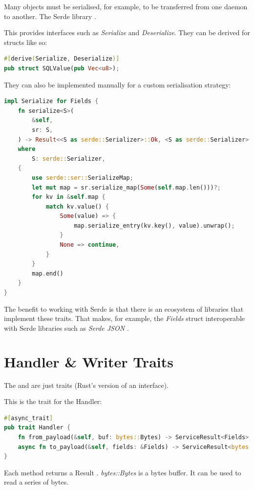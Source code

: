 \documentclass[a4paper,12pt]{report}
\begin{document}
Many objects must be serialised, for example, to be transferred from one daemon to another.
The Serde library \cite{serde}.

This provides interfaces such as \textit{Serialize} and \textit{Deserialize}. They can be derived \cite{derive} for structs like so:

\begin{lstlisting}[language=Rust]
#[derive(Serialize, Deserialize)]
pub struct SQLValue(pub Vec<u8>);
\end{lstlisting}

They can also be implemented manually for a custom serialisation strategy:

\begin{lstlisting}[language=Rust]
impl Serialize for Fields {
    fn serialize<S>(
        &self,
        sr: S,
    ) -> Result<<S as serde::Serializer>::Ok, <S as serde::Serializer>::Error>
    where
        S: serde::Serializer,
    {
        use serde::ser::SerializeMap;
        let mut map = sr.serialize_map(Some(self.map.len()))?;
        for kv in &self.map {
            match kv.value() {
                Some(value) => {
                    map.serialize_entry(kv.key(), value).unwrap();
                }
                None => continue,
            }
        }
        map.end()
    }
}
\end{lstlisting}

The benefit to working with Serde is that there is an ecosystem of libraries that implement these traits.
That makes, for example, the \textit{Fields} struct interoperable with Serde libraries such as \textit{Serde JSON \cite{serde_json}}.

\section{Handler \& Writer Traits}

The  and  are just traits \cite{trait} (Rust's version of an interface).

This is the trait for the Handler:
\begin{lstlisting}[language=Rust]
#[async_trait]
pub trait Handler {
    fn from_payload(&self, buf: bytes::Bytes) -> ServiceResult<Fields>;
    async fn to_payload(&self, fields: &Fields) -> ServiceResult<bytes::Bytes>;
}
\end{lstlisting}

Each method returns a Result \cite{result}.
\textit{bytes::Bytes} is a bytes buffer. It can be used to read a series of bytes.
\end{document}
